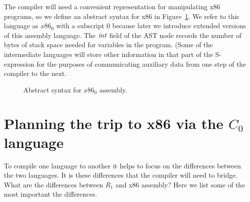 \documentclass[11pt]{book}
\begin{document}
The compiler will need a convenient representation for manipulating
x86 programs, so we define an abstract syntax for x86 in
Figure~\ref{fig:x86-ast-a}. We refer to this language as $x86_0$ with
a subscript $0$ because later we introduce extended versions of this
assembly language. The $\mathit{int}$ field of the  AST node
records the number of bytes of stack space needed for variables in the
program. (Some of the intermediate languages will store other
information in that part of the S-expression for the purposes of
communicating auxiliary data from one step of the compiler to the
next.

\begin{figure}[tp]
\caption{Abstract syntax for $x86_0$ assembly.}
\label{fig:x86-ast-a}
\end{figure}

\section{Planning the trip to x86 via the $C_0$ language}
\label{sec:plan-s0-x86}

To compile one language to another it helps to focus on the
differences between the two languages. It is these differences that
the compiler will need to bridge. What are the differences between
$R_1$ and x86 assembly? Here we list some of the most important the
differences.
\end{document}
